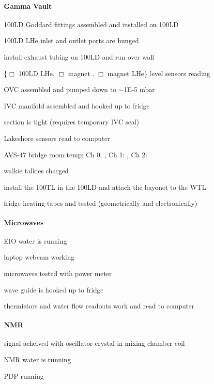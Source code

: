 \begin{appendices}
\paragraph{Gamma Vault}
\begin{checklist}
 \item 100LD Goddard fittings assembled and installed on 100LD
 \item 100LD LHe inlet and outlet ports are bunged
 \item install exhaust tubing on 100LD and run over wall
 \item \{$\Box$ 100LD LHe, $\Box$ magnet \lnn, $\Box$ magnet LHe\} level sensors reading
 \item OVC assembled and pumped down to $\sim$1E-5 mbar %
 \item IVC manifold assembled and hooked up to fridge
 \item \het{} section is tight (requires temporary IVC seal)
 \item Lakeshore sensors read to computer
 \item AVS-47 bridge room temp: Ch 0: \makebox[1cm]{\hrulefill}, Ch 1: \makebox[1cm]{\hrulefill} , Ch 2: \makebox[1cm]{\hrulefill}  
 \item walkie talkies charged
 \item install the 100TL in the 100LD and attach the bayonet to the WTL
 \item fridge heating tapes and tested (geometrically and electronically)
\end{checklist}

\paragraph{Microwaves}
\begin{checklist}
 \item EIO water is running
 \item laptop webcam working
 \item microwaves tested with power meter
 \item wave guide is hooked up to fridge
 \item thermistors and water flow readouts work and read to computer
\end{checklist}

\paragraph{NMR}
\begin{checklist}
 \item signal acheived with oscillator crystal in mixing chamber coil
 \item NMR water is running
 \item PDP running
\end{checklist}



\end{appendices}
